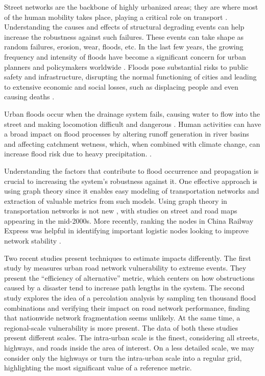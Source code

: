 \documentclass[sn-nature]{sn-jnl}%
\theoremstyle{thmstyleone}%
\theoremstyle{thmstyletwo}%
\theoremstyle{thmstylethree}%
\begin{document}
Street networks are the backbone of highly urbanized areas; they are where most of the human mobility takes place, playing a critical role on transport \cite{yuan2023predicting}. Understanding the causes and effects of structural degrading events can help increase the robustness against such failures. These events can take shape as random failures, erosion, wear, floods, etc. 
In the last few years, the growing frequency and intensity of floods have become a significant concern for urban planners and policymakers worldwide \cite{Zare2018}.
Floods pose substantial risks to public safety and infrastructure, disrupting the normal functioning of cities and leading to extensive economic and social losses, such as displacing people and even causing deaths \cite{Pregnolato2017, ye2021towards}.

Urban floods occur when the drainage system fails, causing water to flow into the street and making locomotion difficult and dangerous \cite{Tomas2022}. 
Human activities can have a broad impact on flood processes by altering runoff generation in river basins and affecting catchment wetness, which, when combined with climate change, can increase flood risk due to heavy precipitation. \cite{Merz2021}. 

Understanding the factors that contribute to flood occurrence and propagation is crucial to increasing the system's robustness against it. One effective approach is using graph theory since it enables easy modeling of transportation networks and extraction of valuable metrics from such models.
Using graph theory in transportation networks is not new \cite{Aez1996}, with studies on street and road maps appearing in the mid-2000s\cite {Porta2006, Jenelius2006}.
More recently, ranking the nodes in China Railway Express was helpful in identifying important logistic nodes looking to improve network stability \cite{Zhang2020}.

Two recent studies present techniques to estimate impacts differently.
The first study by \cite{Morelli2021} measures urban road network vulnerability to extreme events.
They present the ``efficiency of alternative'' metric, which centers on how obstructions caused by a disaster tend to increase path lengths in the system.
The second study \cite{vanGinkel2022} explores the idea of a percolation analysis by sampling ten thousand flood combinations and verifying their impact on road network performance, finding that nationwide network fragmentation seems unlikely. At the same time, a regional-scale vulnerability is more present.
The data of both these studies present different scales.
The intra-urban scale is the finest, considering all streets, highways, and roads inside the area of interest.
On a less detailed scale, we may consider only the highways or turn the intra-urban scale into a regular grid, highlighting the most significant value of a reference metric.
\end{document}

